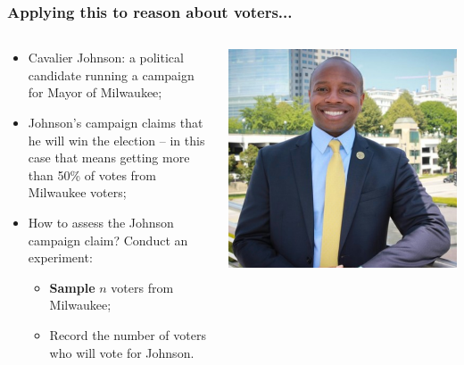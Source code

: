 \documentclass[aspectratio=169]{beamer}
\theoremstyle{principle}
\begin{document}
\begin{frame}
\frametitle{Applying this to reason about voters...}

\begin{columns}
\begin{column}{0.5\textwidth}

\begin{itemize}
\item Cavalier Johnson: a political candidate running a campaign for Mayor of Milwaukee;
\bigskip

\item Johnson's campaign claims that he will win the election -- in this case that means getting more than 50\% of votes from Milwaukee voters;
\bigskip

\item How to assess the Johnson campaign claim?  Conduct an experiment:
\begin{itemize}
\item \textbf{Sample} $n$ voters from Milwaukee;
\item Record the number of voters who will vote for Johnson.
\end{itemize}

\end{itemize}

\end{column}
\begin{column}{0.5\textwidth}
\begin{center}
\includegraphics[scale=0.4]{Johnson.png}
\end{center}
\end{column}
\end{columns}

\end{frame}
\end{document}
